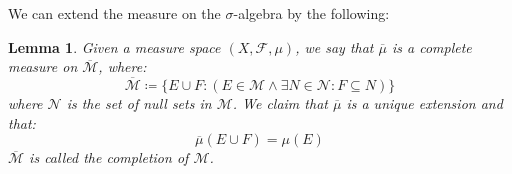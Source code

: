 \documentclass[10pt,letterpaper]{article} %
\newtheorem{lem}{Lemma}[section]
\begin{document}
We can extend the measure on the $\sigma$-algebra by the following:
\begin{lem}
Given a measure space $(X, \mathcal{F}, \mu)$, we say that $\overline{\mu}$ is a complete measure on $\overline{\mathcal{M}}$, where:
\begin{equation*}
\overline{\mathcal{M}} \coloneq \{E \cup F : (E \in \mathcal{M} \land \exists N \in \mathcal{N}: F \subseteq N)\}
\end{equation*}
where $\mathcal{N}$ is the set of null sets in $\mathcal{M}$. We claim that $\overline{\mu}$ is a unique extension and that:
\begin{equation*}
\overline{\mu}(E \cup F) = \mu(E)
\end{equation*}
$\overline{\mathcal{M}}$ is called the completion of $\mathcal{M}$. 
\end{lem}
\end{document}
